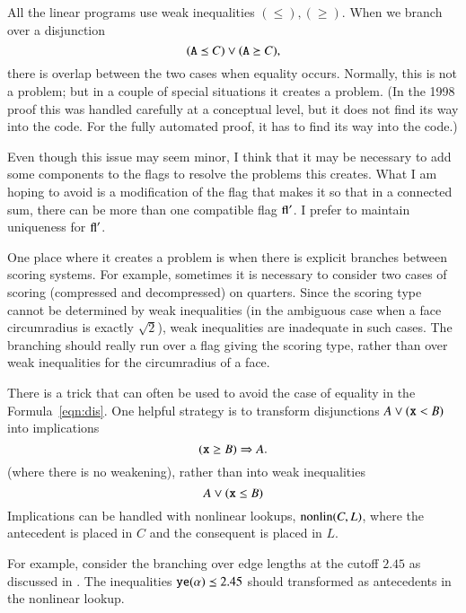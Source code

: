All the linear programs use weak inequalities $(\le),(\ge)$.  When
we branch over a disjunction
    \begin{equation}
    \label{eqn:dis}
    ({\operatorname{{\texttt{A}}}}\preceq C)\vee ({\operatorname{{\texttt{A}}}}\succeq C),
    \end{equation}
there is overlap between the two cases when equality occurs.
Normally, this is not a problem; but in a couple of special
situations it creates a problem.  (In the 1998 proof this was
handled carefully at a conceptual level, but it does not find its
way into the code.  For the fully automated proof, it has to find
its way into the code.)

Even though this issue may seem minor, I think that it may be
necessary to add some components to the flags to resolve the
problems this creates.  What I am hoping to avoid is a
modification of the flag that makes it so that in a connected sum, there
can be more than one compatible flag ${\operatorname{fl}}'$.  I prefer to
maintain uniqueness for ${\operatorname{fl}}'$.

One place where it creates a problem is when there is explicit
branches between scoring systems.   For example, sometimes it is
necessary to consider two cases of scoring (compressed and 
decompressed) on quarters.  Since the scoring type cannot be
determined by weak inequalities (in the ambiguous case when a face
circumradius is exactly $\sqrt2$), weak inequalities are
inadequate in such cases.  The branching should really run over a
flag giving the scoring type, rather than over weak inequalities
for the circumradius of a face.


There is a trick that can often be used to avoid the case of
equality in the Formula~\ref{eqn:dis}.   One helpful strategy is
to transform disjunctions $A\vee ({\operatorname{{\texttt{x}}}} < B)$ into implications
    \begin{equation}
    ({\operatorname{{\texttt{x}}}} \ge B) \Rightarrow A.
    \end{equation}
(where there is no weakening), rather than into weak inequalities
    \begin{equation}
    A \vee ({\operatorname{{\texttt{x}}}}\le B)
    \end{equation}
Implications can be handled with nonlinear lookups,
${\operatorname{nonlin}}(C,L)$, where the antecedent is placed in $C$ and the
consequent is placed in $L$.

\begin{example}  For example, consider the branching over edge
lengths at the cutoff $2.45$ as discussed in \cite[Sec.25.7]{DCG}.
The inequalities ${\operatorname{{\texttt{ye}}}}(\alpha)\preceq 2.45$ should transformed
as antecedents in the nonlinear lookup.  %
\end{example}
